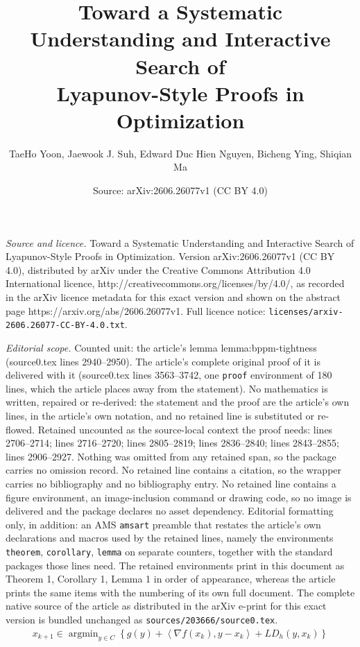 \documentclass[10pt,a4paper]{amsart}
\title{Toward a Systematic Understanding and Interactive Search of \\ Lyapunov-Style Proofs in Optimization}
\author{TaeHo Yoon, Jaewook J. Suh, Edward Duc Hien Nguyen, Bicheng Ying, Shiqian Ma}
\date{Source: arXiv:2606.26077v1 (CC BY 4.0)}
\DeclareMathOperator*{\argmin}{argmin}
\newcommand{\bregprox}{g}
\newcommand{\bregsm}{f}
\newcommand{\inprod}[2]{\left\langle #1,#2 \right\rangle}
\begin{document}
\maketitle

\noindent\emph{Source and licence.} Toward a Systematic Understanding and Interactive Search of \\ Lyapunov-Style Proofs in Optimization. Version arXiv:2606.26077v1 (CC BY 4.0), distributed by arXiv under the Creative Commons Attribution 4.0 International licence, http://creativecommons.org/licenses/by/4.0/, as recorded in the arXiv licence metadata for this exact version and shown on the abstract page https://arxiv.org/abs/2606.26077v1. Full licence notice: \texttt{licenses/arxiv-2606.26077-CC-BY-4.0.txt}.\par\smallskip

\noindent\textit{Editorial scope.} Counted unit: the article's lemma lemma:bppm-tightness (source0.tex lines 2940--2950). The article's complete original proof of it is delivered with it (source0.tex lines 3563--3742, one \texttt{proof} environment of 180 lines, which the article places away from the statement). No mathematics is written, repaired or re-derived: the statement and the proof are the article's own lines, in the article's own notation, and no retained line is substituted or re-flowed.  Retained uncounted as the source-local context the proof needs: lines 2706--2714; lines 2716--2720; lines 2805--2819; lines 2836--2840; lines 2843--2855; lines 2906--2927.  Nothing was omitted from any retained span, so the package carries no omission record.  No retained line contains a citation, so the wrapper carries no bibliography and no bibliography entry.  No retained line contains a figure environment, an image-inclusion command or drawing code, so no image is delivered and the package declares no asset dependency.  Editorial formatting only, in addition: an AMS \texttt{amsart} preamble that restates the article's own declarations and macros used by the retained lines, namely the environments \texttt{theorem}, \texttt{corollary}, \texttt{lemma} on separate counters, together with the standard packages those lines need.  The retained environments print in this document as Theorem 1, Corollary 1, Lemma 1 in order of appearance, whereas the article prints the same items with the numbering of its own full document.  The complete native source of the article as distributed in the arXiv e-print for this exact version is bundled unchanged as \texttt{sources/203666/source0.tex}.
\begin{align}
\label{eq:bpgm_main}
\tag{BPGM}
    x_{k+1}\in \argmin_{y\in C}
    \left\{
        \bregprox(y)+\inprod{\nabla \bregsm(x_k)}{y-x_k}
        +L D_h(y,x_k)
    \right\} 
\end{align}
\end{document}

